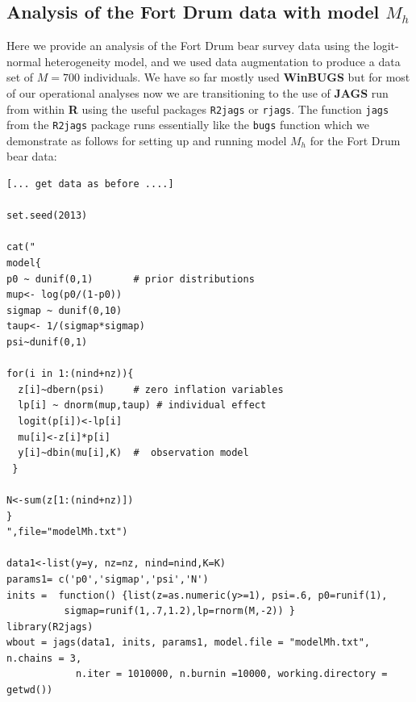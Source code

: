 \subsection{Analysis of the Fort Drum data with model $M_{h}$}
\label{closed.sec.Mhbear}

Here we provide an analysis of the Fort Drum bear survey data using
the  
 logit-normal heterogeneity model, and we 
used data augmentation to produce a data
set of $M=700$ individuals.  
We have so far mostly used 
{\bf
  WinBUGS} but for most of our operational analyses now we are
transitioning to the use of {\bf JAGS} run from within {\bf R} using the useful packages 
 \mbox{\tt R2jags} or \mbox{\tt rjags}.  The function \mbox{\tt jags}
 from the \mbox{\tt R2jags} package runs essentially like the
 \mbox{\tt bugs} function
which we demonstrate 
as follows for setting
 up and running model $M_{h}$ for the Fort Drum bear data:
{\small
\begin{verbatim}
[... get data as before ....]

set.seed(2013)

cat("
model{
p0 ~ dunif(0,1)       # prior distributions
mup<- log(p0/(1-p0))
sigmap ~ dunif(0,10)
taup<- 1/(sigmap*sigmap)
psi~dunif(0,1)

for(i in 1:(nind+nz)){
  z[i]~dbern(psi)     # zero inflation variables
  lp[i] ~ dnorm(mup,taup) # individual effect
  logit(p[i])<-lp[i]
  mu[i]<-z[i]*p[i]
  y[i]~dbin(mu[i],K)  #  observation model
 }

N<-sum(z[1:(nind+nz)])
}
",file="modelMh.txt")

data1<-list(y=y, nz=nz, nind=nind,K=K)
params1= c('p0','sigmap','psi','N')
inits =  function() {list(z=as.numeric(y>=1), psi=.6, p0=runif(1),
          sigmap=runif(1,.7,1.2),lp=rnorm(M,-2)) }
library(R2jags)
wbout = jags(data1, inits, params1, model.file = "modelMh.txt", n.chains = 3, 
            n.iter = 1010000, n.burnin =10000, working.directory = getwd())
\end{verbatim}
}

